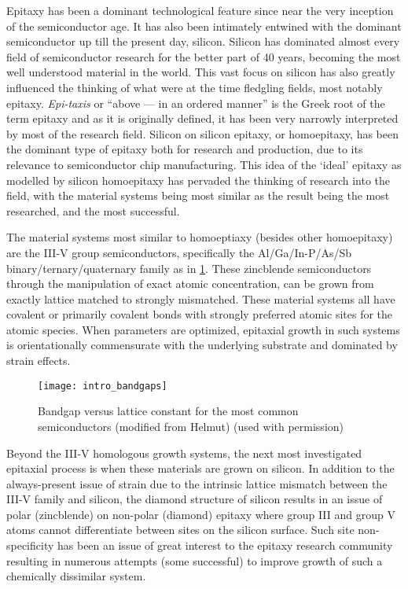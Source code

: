 Epitaxy has been a dominant technological feature since near the very inception of the semiconductor age.
It has also been intimately entwined with the dominant semiconductor up till the present day, silicon.
Silicon has dominated almost every field of semiconductor research for the better part of 40 years, becoming the most well understood material in the world.
This vast focus on silicon has also greatly influenced the thinking of what were at the time fledgling fields, most notably epitaxy.
\emph{Epi-taxis} or ``above --- in an ordered manner'' is the Greek root of the term epitaxy and as it is originally defined, it has been very narrowly interpreted by most of the research field.
Silicon on silicon epitaxy, or homoepitaxy, has been the dominant type of epitaxy both for research and production, due to its relevance to semiconductor chip manufacturing.
This idea of the `ideal' epitaxy as modelled by silicon homoepitaxy has pervaded the thinking of research into the field, with the material systems being most similar as the result being the most researched, and the most successful.

The material systems most similar to homoeptiaxy (besides other homoepitaxy) are the III-V group semiconductors, specifically the Al/Ga/In-P/As/Sb binary/ternary/quaternary family as in \cref{fig:intro_bandgaps}.
These zincblende semiconductors through the manipulation of exact atomic concentration, can be grown from exactly lattice matched to strongly mismatched. These material systems all have covalent or primarily covalent bonds with strongly preferred atomic sites for the atomic species.
When parameters are optimized, epitaxial growth in such systems is orientationally commensurate with the underlying substrate and dominated by strain effects.
\begin{figure}
    \centering
    \texttt{[image: intro\_bandgaps]}
    \caption[Bandgap versus lattice constant]{\label{fig:intro_bandgaps}Bandgap versus lattice constant for the most common semiconductors (modified from Helmut\cite{HelmutFoll2013}) (used with permission)}
\end{figure}

Beyond the III-V homologous growth systems, the next most investigated epitaxial process is when these materials are grown on silicon.
In addition to the always-present issue of strain due to the intrinsic lattice mismatch between the III-V family and silicon, the diamond structure of silicon results in an issue of polar (zincblende) on non-polar (diamond) epitaxy\cite{Kroemer1987} where group III and group V atoms cannot differentiate between sites on the silicon surface.
Such site non-specificity has been an issue of great interest to the epitaxy research community resulting in numerous attempts (some successful)\cite{Kroemer1987} to improve growth of such a chemically dissimilar system.

